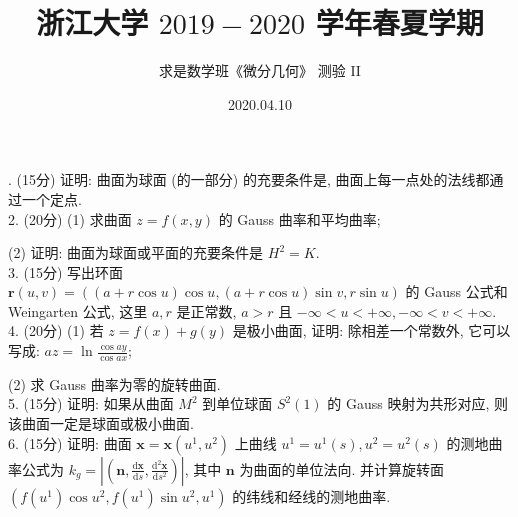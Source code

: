 \documentclass[UTF8]{ctexart}
\title{\LARGE \textbf{浙江大学 $2019-2020$ 学年春夏学期}}
\author{求是数学班《微分几何》 测验 II}
\date{2020.04.10}
\renewcommand{\d}{\text{d}}
\begin{document}
. (15分) 证明: 曲面为球面 (的一部分) 的充要条件是, 曲面上每一点处的法线都通过一个定点.
\\

2. (20分) (1) 求曲面 $z=f(x,y)$ 的 Gauss 曲率和平均曲率;

(2) 证明: 曲面为球面或平面的充要条件是 $H^2=K$.
\\

3. (15分) 写出环面 $\textbf{r}(u,v)=\left((a+r\cos u)\cos u,(a+r\cos u)\sin v,r\sin u\right)$ 
的 Gauss 公式和 Weingarten 公式, 这里 $a,r$ 是正常数, $a>r$ 且 $-\infty<u<+\infty,-\infty<v<+\infty$.
\\

4. (20分) (1) 若 $z=f(x)+g(y)$ 是极小曲面, 证明: 除相差一个常数外, 它可以写成: $\displaystyle az=\ln\frac{\cos ay}{\cos ax}$;

(2) 求 Gauss 曲率为零的旋转曲面.
\\

5. (15分) 证明: 如果从曲面 $M^2$ 到单位球面 $S^2(1)$ 的 Gauss 映射为共形对应, 则该曲面一定是球面或极小曲面.
\\

6. (15分) 证明: 曲面 $\textbf{x}=\textbf{x}(u^1,u^2)$ 上曲线 $u^1=u^1(s),u^2=u^2(s)$
的测地曲率公式为 $\displaystyle k_g=\left|\left(\textbf{n},\frac{\d\textbf{x}}{\d s},\frac{\d^2\textbf{x}}{\d s^2}\right)\right|$,
其中 $\textbf{n}$ 为曲面的单位法向. 并计算旋转面 $\left(f(u^1)\cos u^2,f(u^1)\sin u^2,u^1\right)$
的纬线和经线的测地曲率.
\end{document}
